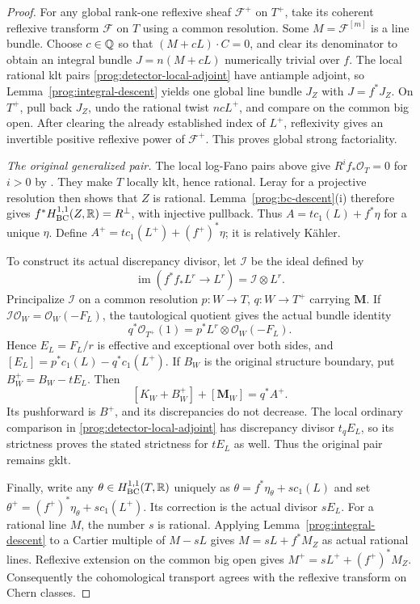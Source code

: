 \begin{proof}
For any global rank-one reflexive sheaf $\mathcal F^+$ on $T^+$,
take its coherent reflexive transform $\mathcal F$ on $T$ using a
common resolution. Some $M=\mathcal F^{[m]}$ is a line bundle.
Choose $c\in\mathbb Q$ so that $(M+cL)\cdot C=0$, and clear its denominator
to obtain an integral bundle $J=n(M+cL)$ numerically trivial over $f$.
The local rational klt pairs \eqref{prog:detector-local-adjoint} have
antiample adjoint, so Lemma~\ref{prog:integral-descent} yields
one global line bundle $J_Z$ with $J=f^*J_Z$.
On $T^+$, pull back $J_Z$, undo the rational twist $ncL^+$, and compare
on the common big open. After clearing the already established index
of $L^+$, reflexivity gives an invertible positive reflexive power of
$\mathcal F^+$. This proves global strong factoriality.

\smallskip\noindent
\emph{The original generalized pair.}
The local log-Fano pairs above give $R^if_*\mathcal O_T=0$ for $i>0$
by \cite[Theorem~5.2]{FujinoAnalyticBCHM}. They make $T$ locally klt, hence rational.
Leray for a projective resolution then shows that $Z$ is rational.
Lemma~\ref{prog:bc-descent}(i) therefore gives
$f^*H^{1,1}_{\mathrm{BC}}(Z,\mathbb R)=R^\perp$, with injective pullback. Thus $A=t c_1(L)+f^*\eta$ for a unique $\eta$.
Define $A^+=t c_1(L^+)+(f^+)^*\eta$; it is relatively K\"ahler.

To construct its actual discrepancy divisor, let $\mathcal I$ be the
ideal defined by
\[
 \operatorname{im}(f^*f_*L^r\longrightarrow L^r)
   =\mathcal I\otimes L^r.
\]
Principalize $\mathcal I$ on a common resolution $p:W\to T$,
$q:W\to T^+$ carrying $\mathbf M$. If
$\mathcal I\mathcal O_W=\mathcal O_W(-F_L)$, the tautological quotient
gives the actual bundle identity
\[
 q^*\mathcal O_{T^+}(1)=p^*L^r\otimes\mathcal O_W(-F_L).
\]
Hence $E_L=F_L/r$ is effective and exceptional over both sides, and
$[E_L]=p^*c_1(L)-q^*c_1(L^+)$. If $B_W$ is the original structure
boundary, put $B_W^+=B_W-tE_L$. Then
\[
 [K_W+B_W^+]+[\mathbf M_W]=q^*A^+.
\]
Its pushforward is $B^+$, and its discrepancies do not decrease.
The local ordinary comparison in \eqref{prog:detector-local-adjoint}
has discrepancy divisor $t_qE_L$, so its strictness proves the stated
strictness for $tE_L$ as well. Thus the original pair remains gklt.

Finally, write any $\theta\in H^{1,1}_{\mathrm{BC}}(T,\mathbb R)$ uniquely as
$\theta=f^*\eta_\theta+s c_1(L)$ and set
$\theta^+=(f^+)^*\eta_\theta+s c_1(L^+)$. Its correction is the actual
divisor $sE_L$. For a rational line $M$, the number $s$ is rational. Applying
Lemma~\ref{prog:integral-descent} to a Cartier multiple of $M-sL$
gives $M=sL+f^*M_Z$ as actual rational lines. Reflexive extension
on the common big open gives $M^+=sL^++(f^+)^*M_Z$.
Consequently the cohomological transport agrees with the reflexive
transform on Chern classes.
\end{proof}


